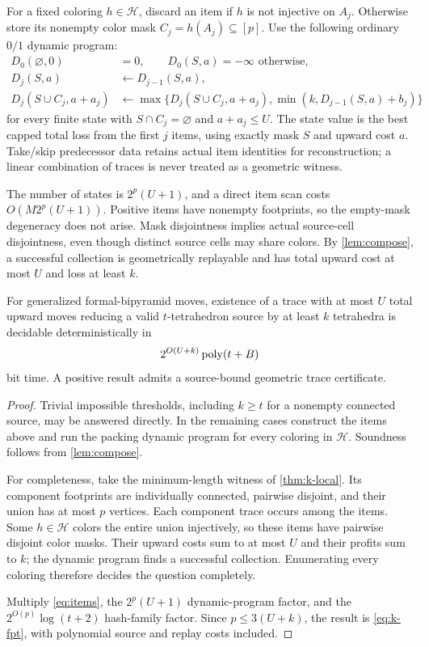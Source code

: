 For a fixed coloring $h\in\mathcal H$, discard an item if $h$ is not
injective on $A_j$. Otherwise store its nonempty color mask
$C_j=h(A_j)\subseteq[p]$. Use the following ordinary $0/1$ dynamic program:
\begin{align*}
 D_0(\varnothing,0)&=0,\qquad D_0(S,a)=-\infty\text{ otherwise},\\
 D_j(S,a)&\gets D_{j-1}(S,a),\\
 D_j(S\cup C_j,a+a_j)&\gets
 \max\{D_j(S\cup C_j,a+a_j),\min(k,D_{j-1}(S,a)+b_j)\}
\end{align*}
for every finite state with $S\cap C_j=\varnothing$ and $a+a_j\le U$.
The state value is the best capped total loss from the first $j$ items,
using exactly mask $S$ and upward cost $a$. Take/skip predecessor data
retains actual item identities for reconstruction; a linear combination of
traces is never treated as a geometric witness.

The number of states is $2^p(U+1)$, and a direct item scan costs
$O(M2^p(U+1))$. Positive items have nonempty footprints, so the empty-mask
degeneracy does not arise. Mask disjointness implies actual source-cell
disjointness, even though distinct source cells may share colors. By
\cref{lem:compose}, a successful collection is geometrically replayable and
has total upward cost at most $U$ and loss at least $k$.

\begin{theorem}\label{thm:k-fpt}
For generalized formal-bipyramid moves, existence of a trace with at most
$U$ total upward moves reducing a valid $t$-tetrahedron source by at least
$k$ tetrahedra is decidable deterministically in
\begin{equation}\label{eq:k-fpt}
 2^{O(U+k)}\operatorname{poly}(t+B)
\end{equation}
bit time. A positive result admits a source-bound geometric trace certificate.
\end{theorem}
\begin{proof}
Trivial impossible thresholds, including $k\ge t$ for a nonempty connected
source, may be answered directly. In the remaining cases construct the
items above and run the packing dynamic program for every coloring in
$\mathcal H$. Soundness follows from \cref{lem:compose}.

For completeness, take the minimum-length witness of \cref{thm:k-local}.
Its component footprints are individually connected, pairwise disjoint,
and their union has at most $p$ vertices. Each component trace occurs among
the items. Some $h\in\mathcal H$ colors the entire union injectively, so
these items have pairwise disjoint color masks. Their upward costs sum to
at most $U$ and their profits sum to $k$; the dynamic program finds a
successful collection. Enumerating every coloring therefore decides the
question completely.

Multiply \eqref{eq:items}, the $2^p(U+1)$ dynamic-program factor, and the
$2^{O(p)}\log(t+2)$ hash-family factor. Since $p\le3(U+k)$, the result is
\eqref{eq:k-fpt}, with polynomial source and replay costs included.
\end{proof}

